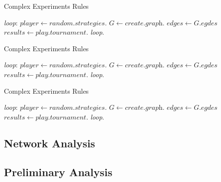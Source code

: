 \begin{algorithm}
  \caption{Complex Experiments Rules}\label{simple-experiment-rules}
  \begin{algorithmic}
  \BState \emph{loop}:
  \State $player \gets \textit{random.strategies}$.
  \State $G \gets \textit{create.graph}$.
  \State $edges \gets \textit{G.egdes}$
  \State $results \gets \textit{play.tournament}$.
  \emph{loop}.
  \EndFor
  \EndFor
  \EndProcedure
  \end{algorithmic}
\end{algorithm}

\begin{algorithm}
  \caption{Complex Experiments Rules}\label{simple-experiment-rules}
  \begin{algorithmic}
  \BState \emph{loop}:
  \State $player \gets \textit{random.strategies}$.
  \State $G \gets \textit{create.graph}$.
  \State $edges \gets \textit{G.egdes}$
  \State $results \gets \textit{play.tournament}$.
  \emph{loop}.
  \EndFor
  \EndFor
  \EndProcedure
  \end{algorithmic}
\end{algorithm}

\begin{algorithm}
  \caption{Complex Experiments Rules}\label{simple-experiment-rules}
  \begin{algorithmic}
  \BState \emph{loop}:
  \State $player \gets \textit{random.strategies}$.
  \State $G \gets \textit{create.graph}$.
  \State $edges \gets \textit{G.egdes}$
  \State $results \gets \textit{play.tournament}$.
  \emph{loop}.
  \EndFor
  \EndFor
  \EndProcedure
  \end{algorithmic}
\end{algorithm}

\subsection{Network Analysis}

\subsection{Preliminary Analysis}

